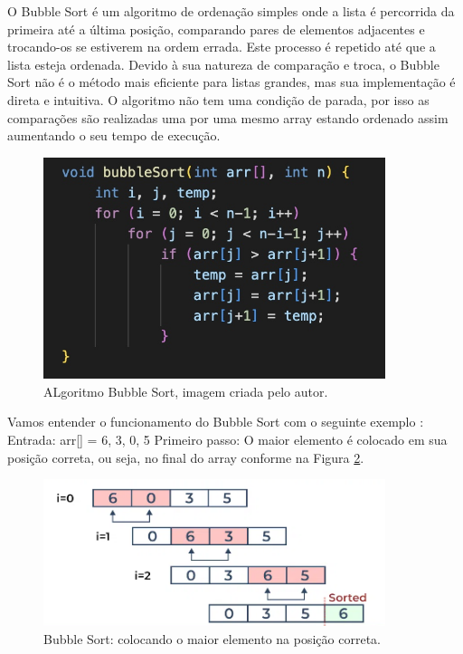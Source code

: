 O Bubble Sort é um algoritmo de ordenação simples onde a lista é percorrida da primeira até a última posição, comparando pares de elementos adjacentes e trocando-os se estiverem na ordem errada\cite{cormen2009introduction}. Este processo é repetido até que a lista esteja ordenada. Devido à sua natureza de comparação e troca, o Bubble Sort não é o método mais eficiente para listas grandes, mas sua implementação é direta e intuitiva. O algoritmo não
tem uma condição de parada, por isso as comparações são realizadas uma por uma mesmo array estando ordenado assim aumentando o seu tempo de execução.

\begin{figure}[h!]
    \centering
    \includegraphics[width = 10cm]{Imagens/Bubble Sort/ImagemBubble.jpg}
    \caption{ALgoritmo Bubble Sort, imagem criada pelo autor.}
    \label{fig:imagembubble}
\end{figure}

Vamos entender o funcionamento do Bubble Sort com o seguinte exemplo \cite{sitebubble}: 
Entrada: arr[] = {6, 3, 0, 5}
Primeiro passo: O maior elemento é colocado em sua posição correta, ou seja, no final do array conforme na Figura \ref{fig:b1}.

\begin{figure}[h!]
    \centering
    \includegraphics[width = 10cm]{Imagens/Bubble Sort/bubble1.png}
    \caption{Bubble Sort: colocando o maior elemento na posição correta.}
    \label{fig:b1}
\end{figure}

